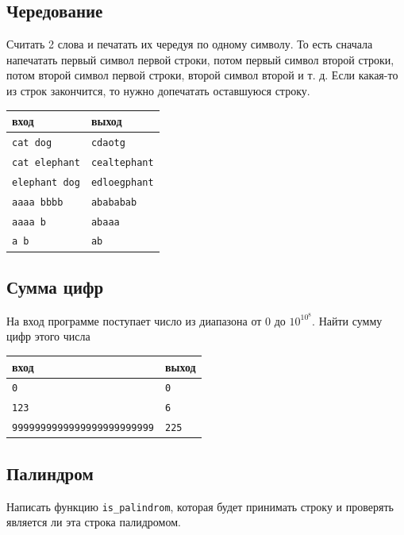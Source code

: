 \documentclass[10pt]{article}
\begin{document}
\subsection{Чередование}
Считать 2 слова и печатать их чередуя по одному символу. То есть сначала напечатать первый символ первой строки, потом первый символ второй строки, потом второй символ первой строки, второй символ второй и т. д. Если какая-то из строк закончится, то нужно допечатать оставшуюся строку.
\begin{center}
\begin{tabular}{ l | l }
 вход & выход \\ \hline
 \texttt{cat dog} & \texttt{cdaotg}  \\ 
 \texttt{cat elephant} & \texttt{cealtephant} \\
 \texttt{elephant dog} & \texttt{edloegphant} \\
 \texttt{aaaa bbbb} & \texttt{abababab} \\
 \texttt{aaaa b} & \texttt{abaaa}\\ 
 \texttt{a b} & \texttt{ab}\\ 
\end{tabular}
\end{center}


\subsection{Сумма цифр}
На вход программе поступает число из диапазона от $0$ до $10^{10^8}$. Найти сумму цифр этого числа 
\begin{center}
\begin{tabular}{ l | l }
 вход & выход \\ \hline
 \texttt{0} & \texttt{0}  \\ 
 \texttt{123} & \texttt{6} \\
 \texttt{9999999999999999999999999} & \texttt{225} \\
\end{tabular}
\end{center}


\subsection{Палиндром}
Написать функцию \texttt{is\_palindrom}, которая будет принимать строку и проверять является ли эта строка палидромом.
\end{document}
